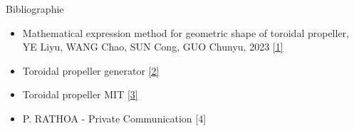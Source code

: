 \documentclass{beamer}
\begin{document}
\begin{frame}{Bibliographie}
    \begin{itemize}
        \item Mathematical expression method for geometric shape of toroidal propeller, YE Liyu, WANG Chao, SUN Cong, GUO Chunyu, 2023 \href{http://www.ship-research.com/cn/article/doi/10.19693/j.issn.1673-3185.03419}{[1]}
        \item Toroidal propeller generator \href{https://github.com/RaulBejarano/Ultimate-Toroidal-Propeller-Generator}{[2]}
        \item Toroidal propeller MIT \href{https://www.ll.mit.edu/sites/default/files/other/doc/2023-02/TVO_Technology_Highlight_41_Toroidal_Propeller.pdf}{[3]}
        \item P. RATHOA - Private Communication [4]
    \end{itemize}
\end{frame}
\end{document}
